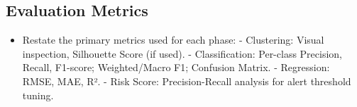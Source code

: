 \subsection{Evaluation Metrics}
\begin{itemize}
    \item Restate the primary metrics used for each phase:
        - Clustering: Visual inspection, Silhouette Score (if used).
        - Classification: Per-class Precision, Recall, F1-score; Weighted/Macro F1; Confusion Matrix.
        - Regression: RMSE, MAE, R².
        - Risk Score: Precision-Recall analysis for alert threshold tuning.
\end{itemize}


